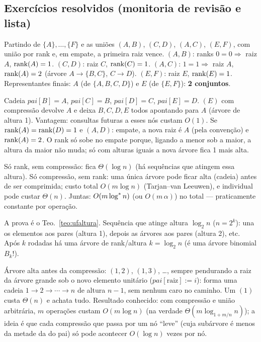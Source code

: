 \subsection{Exercícios resolvidos (monitoria de revisão e lista)}
\begin{exemplo}[Revisão, Q2]\leavevmode
Partindo de $\{A\},\dots,\{F\}$ e as uniões \Union$(A,B)$, \Union$(C,D)$, \Union$(A,C)$, \Union$(E,F)$, com união por rank e, em empate, a primeira raiz vence.
\Union$(A,B)$: ranks $0=0\Rightarrow$ raiz $A$, $\operatorname{rank}(A)=1$. \Union$(C,D)$: raiz $C$, $\operatorname{rank}(C)=1$. \Union$(A,C)$: $1=1\Rightarrow$ raiz $A$, $\operatorname{rank}(A)=2$ (árvore $A\to\{B,C\}$, $C\to D$). \Union$(E,F)$: raiz $E$, $\operatorname{rank}(E)=1$. Representantes finais: $A$ (de $\{A,B,C,D\}$) e $E$ (de $\{E,F\}$): \textbf{2 conjuntos}.
\end{exemplo}
\begin{exemplo}[Revisão, Q3 e Q4]
Cadeia $pai[B]=A$, $pai[C]=B$, $pai[D]=C$, $pai[E]=D$. \Find$(E)$ com compressão devolve $A$ e deixa $B,C,D,E$ todos apontando para $A$ (árvore de altura 1). Vantagem: consultas futuras a esses nós custam $O(1)$.
Se $\operatorname{rank}(A)=\operatorname{rank}(D)=1$ e \Union$(A,D)$: empate, a nova raiz é $A$ (pela convenção) e $\operatorname{rank}(A)=2$. O rank só sobe no empate porque, ligando a menor sob a maior, a altura da maior não muda; só com alturas iguais a nova árvore fica 1 mais alta.
\end{exemplo}
\begin{exemplo}
Só rank, sem compressão: \Find{} fica $\Theta(\log n)$ (há sequências que atingem essa altura). Só compressão, sem rank: uma única árvore pode ficar alta (cadeia) antes de ser comprimida; custo total $O(m\log n)$ (Tarjan--van Leeuwen), e \Find{} individual pode custar $\Theta(n)$. Juntas: $O(m\log^{*} n)$ (ou $O(m\,\alpha)$) no total --- praticamente constante por operação.
\end{exemplo}
\begin{exemplo}
A prova é o Teo.~\ref{teo:ufaltura}. Sequência que atinge altura $\log_2 n$ ($n=2^k$): una os elementos aos pares (altura 1), depois as árvores aos pares (altura 2), etc. Após $k$ rodadas há uma árvore de rank/altura $k=\log_2n$ (é uma árvore binomial $B_k$!).
\end{exemplo}
\begin{exemplo}
Árvore alta antes da compressão: \Union$(1,2)$, \Union$(1,3)$, \dots, sempre pendurando a raiz da árvore grande sob o novo elemento unitário ($pai[\text{raiz}]:=i$): forma uma cadeia $1\to2\to\cdots\to n$ de altura $n-1$, sem nenhum \Find{} caro no caminho. Um \Find$(1)$ custa $\Theta(n)$ e achata tudo. Resultado conhecido: com compressão e união arbitrária, $m$ operações custam $O(m\log n)$ (na verdade $\Theta(m\log_{1+m/n}n)$); a ideia é que cada compressão que passa por um nó ``leve'' (cuja subárvore é menos da metade da do pai) só pode acontecer $O(\log n)$ vezes por nó.
\end{exemplo}

